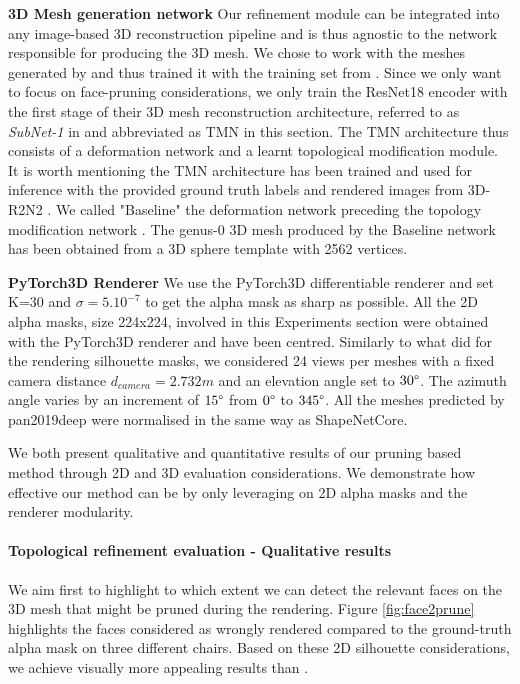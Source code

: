 \noindent\textbf{3D Mesh generation network} Our refinement module can be integrated into any image-based 3D reconstruction pipeline and is thus agnostic to the network responsible for producing the 3D mesh. We chose to work with the meshes generated by \citep{pan2019deep} and thus trained it with the training set from \citep{chang2015shapenet}. Since we only want to focus on face-pruning considerations, we only train the ResNet18 encoder with the first stage of their 3D mesh reconstruction architecture, referred to as \textit{SubNet-1} in \citep{pan2019deep} and abbreviated as TMN in this section. The TMN architecture thus consists of a deformation network and a learnt topological modification module. It is worth mentioning the TMN \citep{pan2019deep} architecture has been trained and used for inference with the provided ground truth labels and rendered images from 3D-R2N2 \citep{choy20163d}. We called "Baseline" the deformation network preceding the topology modification network \citep{pan2019deep}. The genus-0 3D mesh produced by the Baseline network has been obtained from a 3D sphere template with 2562 vertices. 


\noindent\textbf{PyTorch3D Renderer} We use the PyTorch3D \citep{nie2020total3dunderstanding} differentiable renderer and set K=30 and $\sigma=5.10^{-7}$ to get the alpha mask as sharp as possible. All the 2D alpha masks, size 224x224, involved in this Experiments section were obtained with the PyTorch3D renderer and have been centred. Similarly to what \citep{choy20163d,liu2019soft,yan2016perspective} did for the rendering silhouette masks, we considered 24 views per meshes with a fixed camera distance $d_{camera}=2.732m$ and an elevation angle set to $30\degree$. The azimuth angle varies by an increment of $15\degree$ from $0\degree$ to $345\degree$. All the meshes predicted by pan2019deep \citep{pan2019deep} were normalised in the same way as ShapeNetCore\citep{chang2015shapenet}. 

We both present qualitative and quantitative results of our pruning based method through 2D and 3D evaluation considerations. We demonstrate how effective our method can be by only leveraging on 2D alpha masks and the renderer modularity. 

\paragraph{Topological refinement evaluation - Qualitative results}

We aim first to highlight to which extent we can detect the relevant faces on the 3D mesh that might be pruned during the rendering. Figure \ref{fig:face2prune} highlights the faces considered as wrongly rendered compared to the ground-truth alpha mask on three different chairs. Based on these 2D silhouette considerations, we achieve visually more appealing results than \citep{pan2019deep}. 

